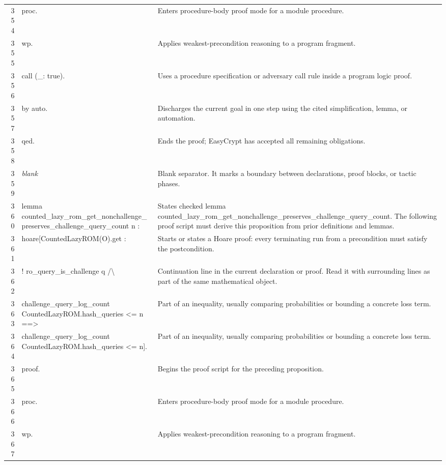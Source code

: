 \documentclass[10pt]{article}
\begin{document}
\begin{longtable}{r L{0.53\textwidth} L{0.37\textwidth}}
354 & {\ttfamily\scriptsize proc.} & Enters procedure-body proof mode for a module procedure. \\
355 & {\ttfamily\scriptsize wp.} & Applies weakest-precondition reasoning to a program fragment. \\
356 & {\ttfamily\scriptsize call (\_: true).} & Uses a procedure specification or adversary call rule inside a program logic proof. \\
357 & {\ttfamily\scriptsize by auto.} & Discharges the current goal in one step using the cited simplification, lemma, or automation. \\
358 & {\ttfamily\scriptsize qed.} & Ends the proof; EasyCrypt has accepted all remaining obligations. \\
359 & {\ttfamily\scriptsize \emph{blank}} & Blank separator.  It marks a boundary between declarations, proof blocks, or tactic phases. \\
360 & {\ttfamily\scriptsize lemma counted\_lazy\_rom\_get\_nonchallenge\_preserves\_challenge\_query\_count n :} & States checked lemma counted\_lazy\_rom\_get\_nonchallenge\_preserves\_challenge\_query\_count.  The following proof script must derive this proposition from prior definitions and lemmas. \\
361 & {\ttfamily\scriptsize   hoare[CountedLazyROM(O).get :} & Starts or states a Hoare proof: every terminating run from a precondition must satisfy the postcondition. \\
362 & {\ttfamily\scriptsize     ! ro\_query\_is\_challenge q /\textbackslash{}} & Continuation line in the current declaration or proof.  Read it with surrounding lines as part of the same mathematical object. \\
363 & {\ttfamily\scriptsize     challenge\_query\_log\_count CountedLazyROM.hash\_queries <= n ==>} & Part of an inequality, usually comparing probabilities or bounding a concrete loss term. \\
364 & {\ttfamily\scriptsize     challenge\_query\_log\_count CountedLazyROM.hash\_queries <= n].} & Part of an inequality, usually comparing probabilities or bounding a concrete loss term. \\
365 & {\ttfamily\scriptsize proof.} & Begins the proof script for the preceding proposition. \\
366 & {\ttfamily\scriptsize proc.} & Enters procedure-body proof mode for a module procedure. \\
367 & {\ttfamily\scriptsize wp.} & Applies weakest-precondition reasoning to a program fragment. \\

\end{longtable}
\end{document}
